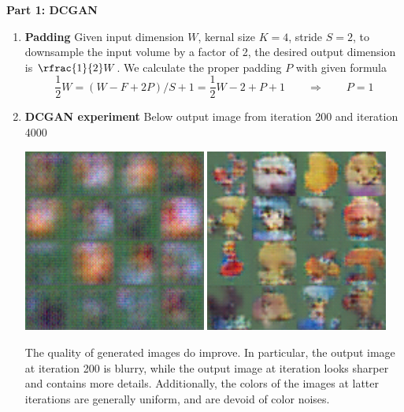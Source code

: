 \documentclass[11pt]{article}
\begin{document}
\textbf{Part 1: DCGAN}

\begin{enumerate}
    \item \textbf{Padding} Given input dimension $W$, kernal size $K=4$, stride $S=2$, to downsample the input volume by a factor of 2, the desired output dimension is $\rfrac{1}{2} W$. We calculate the proper padding $P$ with given formula
    \[
        \frac{1}{2} W = (W - F + 2P) / S + 1 = \frac{1}{2}W - 2 + P + 1
        \qquad \Rightarrow \qquad 
        P = 1
    \]
    \item \textbf{DCGAN experiment}
    Below output image from iteration 200 and iteration 4000
    \begin{center}
        \includegraphics[width=6cm]{../samples_vanilla/sample-000200.png}
        \includegraphics[width=6cm]{../samples_vanilla/sample-004000.png}
    \end{center}
    The quality of generated images do improve. In particular, the output image at iteration 200 is blurry, while the output image at iteration looks sharper and contains more details. Additionally, the colors of the images at latter iterations are generally uniform, and are devoid of color noises.
\end{enumerate}

\newpage
\end{document}
